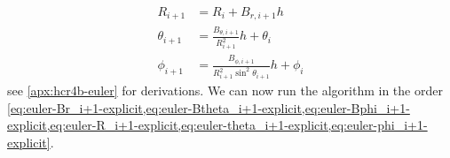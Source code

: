 \begin{align}
    R_{i+1} &= R_i + B_{r,i+1} h \label{eq:euler-R_i+1-explicit} \\
    \theta_{i+1} &= \frac{B_{\theta,i+1}}{R_{i+1}^2} h + \theta_i \label{eq:euler-theta_i+1-explicit} \\
    \phi_{i+1} &= \frac{B_{\phi,i+1}}{R_{i+1}^2 \sin^2{\theta_{i+1}}} h + \phi_i \label{eq:euler-phi_i+1-explicit}
\end{align}
see \cref{apx:hcr4b-euler} for derivations. We can now run the algorithm in the order \cref{eq:euler-Br_i+1-explicit,eq:euler-Btheta_i+1-explicit,eq:euler-Bphi_i+1-explicit,eq:euler-R_i+1-explicit,eq:euler-theta_i+1-explicit,eq:euler-phi_i+1-explicit}.